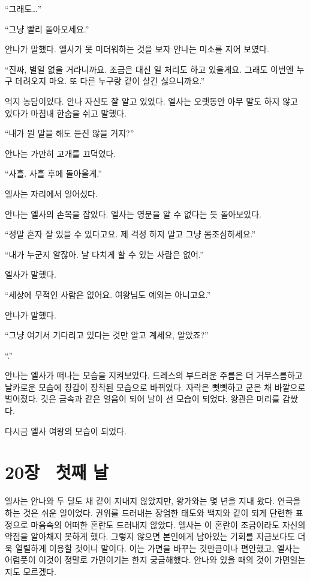``그래도\ldots''

``그냥 빨리 돌아오세요.''

안나가 말했다. 엘사가 못 미더워하는 것을 보자 안나는 미소를 지어 보였다.

``진짜, 별일 없을 거라니까요. 조금은 대신 일 처리도 하고 있을게요. 그래도 이번엔 누구 데려오지 마요. 또 다른 누구랑 같이 살긴 싫으니까요.''

억지 농담이었다. 안나 자신도 잘 알고 있었다. 엘사는 오랫동안 아무 말도 하지 않고 있다가 마침내 한숨을 쉬고 말했다.

``내가 뭔 말을 해도 듣진 않을 거지?''

안나는 가만히 고개를 끄덕였다.

``사흘. 사흘 후에 돌아올게.''

엘사는 자리에서 일어섰다.

안나는 엘사의 손목을 잡았다. 엘사는 영문을 알 수 없다는 듯 돌아보았다.

``정말 혼자 잘 있을 수 있다고요. 제 걱정 하지 말고 그냥 몸조심하세요.''

``내가 누군지 알잖아. 날 다치게 할 수 있는 사람은 없어.''

엘사가 말했다.

``세상에 무적인 사람은 없어요. 여왕님도 예외는 아니고요.''

안나가 말했다.

``그냥 여기서 기다리고 있다는 것만 알고 계세요, 알았죠?''

``.''

안나는 엘사가 떠나는 모습을 지켜보았다. 드레스의 부드러운 주름은 더 거무스름하고 날카로운 모습에 장갑이 장착된 모습으로 바뀌었다. 자락은 뻣뻣하고 굳은 채 바깥으로 벌어졌다. 깃은 금속과 같은 얼음이 되어 날이 선 모습이 되었다. 왕관은 머리를 감쌌다.

다시금 엘사 여왕의 모습이 되었다.



\chapter[20장  첫째 날][20장\hspace*{.5em}첫째 날]{20장 \ 첫째 날}



엘사는 안나와 두 달도 채 같이 지내지 않았지만, 왕가와는 몇 년을 지내 왔다. 연극을 하는 것은 쉬운 일이었다. 권위를 드러내는 장엄한 태도와 백지와 같이 되게 단련한 표정으로 마음속의 어떠한 혼란도 드러내지 않았다. 엘사는 이 혼란이 조금이라도 자신의 약점을 알아채지 못하게 했다. 그렇지 않으면 본인에게 남아있는 기회를 지금보다도 더욱 열렬하게 이용할 것이니 말이다. 이는 가면을 바꾸는 것만큼이나 편안했고, 엘사는 어렴풋이 이것이 정말로 가면이기는 한지 궁금해했다. 안나와 있을 때의 것이 가면일는지도 모르겠다.

